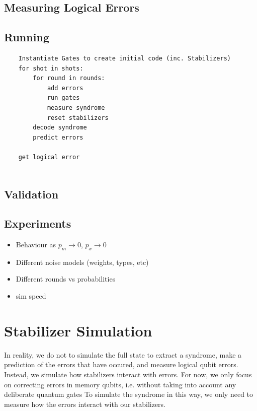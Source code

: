\documentclass[a4paper,12pt]{article}
\begin{document}
\subsection{Measuring Logical Errors}
\subsection{Running}

\begin{verbatim}
    Instantiate Gates to create initial code (inc. Stabilizers)
    for shot in shots:    
        for round in rounds:
            add errors
            run gates
            measure syndrome
            reset stabilizers
        decode syndrome
        predict errors

    get logical error
        
\end{verbatim}

\subsection{Validation}


\subsection{Experiments}

\begin{itemize}
    \item Behaviour as $p_m \rightarrow 0$, $p_x \rightarrow 0$
    \item Different noise models (weights, types, etc)
    \item Different rounds vs probabilities
    \item sim speed
\end{itemize}


\section{Stabilizer Simulation}

In reality, we do not to simulate the full state to extract a syndrome, make a prediction of the errors that have occured, and measure logical qubit errors.
Instead, we simulate how stabilizers interact with errors.
For now, we only focus on correcting errors in memory qubits, i.e. without taking into account any deliberate quantum gates
To simulate the syndrome in this way, we only need to measure how the errors interact with our stabilizers.
\end{document}
